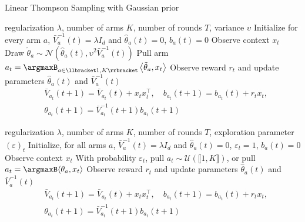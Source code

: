 \begin{algorithm}[H]
  \caption{Linear Thompson Sampling with Gaussian prior}
  \label{alg:linTS}
\begin{algorithmic}
   regularization  $\lambda$, number of arms $K$, number of rounds $T$, variance $\upsilon$
  \STATE Initialize for every arm $a$, $\bar{V}_{a}^{-1}(t) = \lambda I_{d}$ and $\hat{\theta}_{a}(t) = 0$, $b_{a}(t) = 0$
  \STATE Observe context $x_{t}$
  \STATE Draw $\tilde{\theta}_{a}\sim\mathcal{N}(\hat{\theta}_{a}(t), \upsilon^{2}\bar{V}_{a}^{-1}(t))$
  \STATE Pull arm $a_{t} = \argmaxB_{a\in \llbracket 1, K\rrbracket} \left\langle \tilde{\theta}_{a}, x_{t}\right\rangle$
  \STATE Observe reward $r_{t}$ and update parameters $\hat{\theta}_{a}(t)$ and $\bar{V}_{a}^{-1}(t)$
    \begin{align*}
      &\bar{V}_{a_{t}}(t+1) = \bar{V}_{a_{t}}(t) + x_{t}x_{t}^{\intercal},\quad b_{a_{t}}(t+1) = b_{a_{t}}(t) + r_{t}x_{t},\\
      &\theta_{a_{t}}(t+1) = \bar{V}_{a_{t}}^{-1}(t+1)b_{a_{t}}(t+1)
  \end{align*}
  \ENDFOR
\end{algorithmic}
\end{algorithm}

\begin{algorithm}[H]
  \caption{\epsgreedy}
  \label{alg:egreedy}
\begin{algorithmic}
   regularization  $\lambda$, number of arms $K$, number of rounds $T$, exploration parameter $(\varepsilon)_{t}$
	\STATE Initialize, for all arms $a$, $\bar{V}_{a}^{-1}(t) = \lambda I_{d}$ and $\hat{\theta}_{a}(t) = 0$, $\varepsilon_{t} = 1$, $b_{a}(t) = 0$
  \STATE Observe context $x_{t}$
  \STATE With probability $\varepsilon_{t}$, pull $a_{t} \sim \mathcal{U}\left(\llbracket 1,K\rrbracket\right)$, or pull $a_{t} = \argmaxB \langle \theta_{a}, x_{t}\rangle$ 
  \STATE Observe reward $r_{t}$ and update parameters $\hat{\theta}_{a}(t)$ and $\bar{V}_{a}^{-1}(t)$
    \begin{align*}
      &\bar{V}_{a_{t}}(t+1) = \bar{V}_{a_{t}}(t) + x_{t}x_{t}^{\intercal},\quad b_{a_{t}}(t+1) = b_{a_{t}}(t) + r_{t}x_{t},\\
      &\theta_{a_{t}}(t+1) = \bar{V}_{a_{t}}^{-1}(t+1)b_{a_{t}}(t+1)
  \end{align*}
  \ENDFOR
\end{algorithmic}
\end{algorithm}

